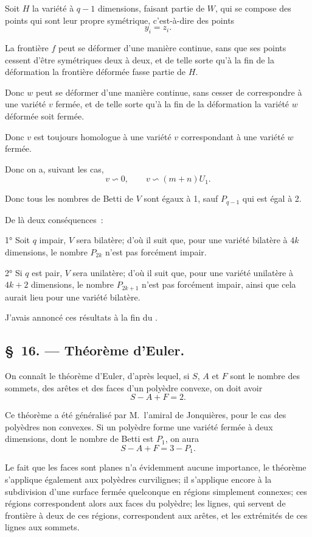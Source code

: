\documentclass{article}
\begin{document}
Soit $H$ la variété à $q - 1$ dimensions, faisant partie de $W$, qui se compose des points qui sont leur propre symétrique, c'est-à-dire des points
\[ y_{i} = z_{i}. \]

La frontière $f$ peut se déformer d'une manière continue, sans que ses points cessent d'être symétriques deux à deux, et de telle sorte qu'à la fin de la déformation la frontière déformée fasse partie de $H$.

Donc $w$ peut se déformer d'une manière continue, sans cesser de correspondre à une variété $v$ fermée, et de telle sorte qu'à la fin de la déformation la variété $w$ déformée soit fermée.

Donc $v$ est toujours homologue à une variété $v$ correspondant à une variété $w$ fermée.

Donc on a, suivant les cas,
\[ v \backsim 0, \qquad v \backsim (m + n)U_{1}. \]

Donc tous les nombres de Betti de $V$ sont égaux à 1, sauf $P_{q-1}$ qui est égal à 2.

De là deux conséquences~:

1° Soit $q$ impair, $V$ sera bilatère; d'où il suit que, pour une variété bilatère à $4k$ dimensions, le nombre $P_{2k}$ n'est pas forcément impair.

2° Si $q$ est pair, $V$ sera unilatère; d'où il suit que, pour une variété unilatère à $4k + 2$ dimensions, le nombre $P_{2k+1}$ n'est pas forcément impair, ainsi que cela aurait lieu pour une variété bilatère.

J'avais annoncé ces résultats à la fin du .

\subsection*{\S~16. --- Théorème d'Euler.}

On connaît le théorème d'Euler, d'après lequel, si $S$, $A$ et $F$ sont le nombre des sommets, des arêtes et des faces d'un polyèdre convexe, on doit avoir
\[ S - A + F = 2. \]

Ce théorème a été généralisé par M.~l'amiral de Jonquières, pour le cas des polyèdres non convexes. Si un polyèdre forme une variété fermée à deux dimensions, dont le nombre de Betti est $P_{1}$, on aura
\[ S - A + F = 3 - P_{1}. \]

Le fait que les faces sont planes n'a évidemment aucune importance, le théorème s'applique également aux polyèdres curvilignes; il s'applique encore à la subdivision d'une surface fermée quelconque en régions simplement connexes; ces régions correspondent alors aux faces du polyèdre; les lignes, qui servent de frontière à deux de ces régions, correspondent aux arêtes, et les extrémités de ces lignes aux sommets.
\end{document}
